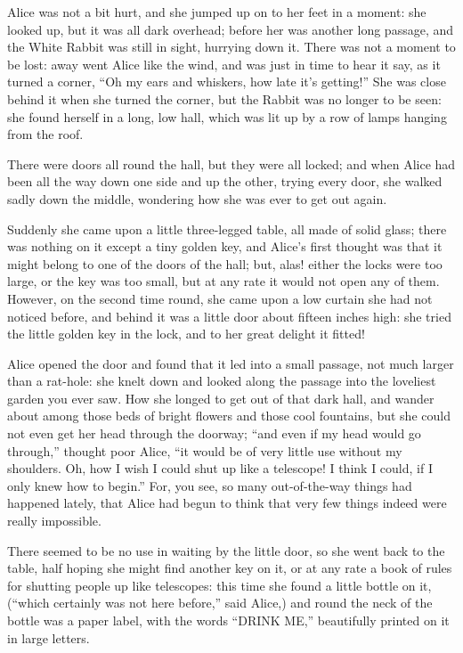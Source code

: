\documentclass{book}
\begin{document}
Alice was not a bit hurt, and she jumped up on to her feet in a moment: she looked up, but it was all dark overhead; before her was another long passage, and the White Rabbit was still in sight, hurrying down it. There was not a moment to be lost: away went Alice like the wind, and was just in time to hear it say, as it turned a corner, ``Oh my ears and whiskers, how late it’s getting!'' She was close behind it when she turned the corner, but the Rabbit was no longer to be seen: she found herself in a long, low hall, which was lit up by a row of lamps hanging from the roof.

There were doors all round the hall, but they were all locked; and when Alice had been all the way down one side and up the other, trying every door, she walked sadly down the middle, wondering how she was ever to get out again.

Suddenly she came upon a little three-legged table, all made of solid glass; there was nothing on it except a tiny golden key, and Alice’s first thought was that it might belong to one of the doors of the hall; but, alas! either the locks were too large, or the key was too small, but at any rate it would not open any of them. However, on the second time round, she came upon a low curtain she had not noticed before, and behind it was a little door about fifteen inches high: she tried the little golden key in the lock, and to her great delight it fitted!

Alice opened the door and found that it led into a small passage, not much larger than a rat-hole: she knelt down and looked along the passage into the loveliest garden you ever saw. How she longed to get out of that dark hall, and wander about among those beds of bright flowers and those cool fountains, but she could not even get her head through the doorway; ``and even if my head would go through,'' thought poor Alice, ``it would be of very little use without my shoulders. Oh, how I wish I could shut up like a telescope! I think I could, if I only knew how to begin.'' For, you see, so many out-of-the-way things had happened lately, that Alice had begun to think that very few things indeed were really impossible.

There seemed to be no use in waiting by the little door, so she went back to the table, half hoping she might find another key on it, or at any rate a book of rules for shutting people up like telescopes: this time she found a little bottle on it, (``which certainly was not here before,'' said Alice,) and round the neck of the bottle was a paper label, with the words ``DRINK ME,'' beautifully printed on it in large letters.
\end{document}
